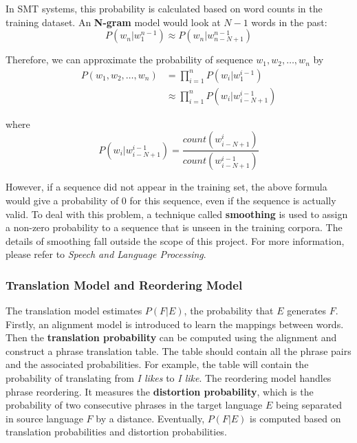 \documentclass[12pt,a4paper,twoside,openright]{report}
\begin{document}
In SMT systems, this probability is calculated based on word counts in the training dataset. An \textbf{N-gram} model would look at $N-1$ words in the past:
\begin{equation*}
P(w_n|w_1^{n-1}) \approx P(w_n|w_{n-N+1}^{n-1})
\end{equation*}

Therefore, we can approximate the probability of sequence $w_1, w_2, \dots, w_n$ by
\begin{equation*}
\begin{split}
P(w_1, w_2, \dots, w_n) & = \prod_{i=1}^{n}P(w_i|w_1^{i-1})\\
 & \approx \prod_{i=1}^{n}P(w_i|w_{i-N+1}^{i-1})
\end{split}
\end{equation*}

where
\begin{equation*}
P(w_i|w_{i-N+1}^{i-1}) = \frac{count(w_{i-N+1}^i)}{count(w_{i-N+1}^{i-1})}
\end{equation*}

However, if a sequence did not appear in the training set, the above formula would give a probability of 0 for this sequence, even if the sequence is actually valid. To deal with this problem, a technique called \textbf{smoothing} is used to assign a non-zero probability to a sequence that is unseen in the training corpora. The details of smoothing fall outside the scope of this project. For more information, please refer to \textit{Speech and Language Processing}\cite{Jurafsky:2009:SLP:1214993}.

\subsubsection{Translation Model and Reordering Model}
The translation model estimates $P(F|E)$,  the probability that $E$ generates $F$. Firstly, an alignment model is introduced to learn the mappings between words. Then the \textbf{translation probability} can be computed using the alignment and construct a phrase translation table. The table should contain all the phrase pairs and the associated probabilities. For example, the table will contain the probability of translating from \textit{I likes} to \textit{I like}. The reordering model handles phrase reordering. It measures the \textbf{distortion probability}, which is the probability of two consecutive phrases in the target language $E$ being separated in source language $F$ by a distance. Eventually, $P(F|E)$ is computed based on translation probabilities and distortion probabilities.
\end{document}
